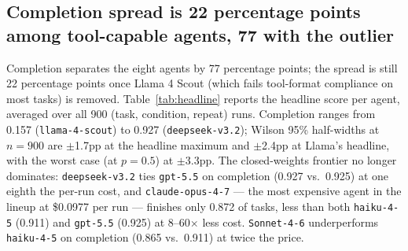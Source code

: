 \subsection{Completion spread is 22 percentage points among tool-capable agents, 77 with the outlier}
Completion separates the eight agents by 77 percentage points; the
spread is still 22 percentage points once Llama 4 Scout (which fails
tool-format compliance on most tasks) is removed.
Table~\ref{tab:headline} reports the headline score per agent,
averaged over all 900 (task, condition, repeat) runs. Completion
ranges from 0.157 (\texttt{llama-4-scout}) to 0.927
(\texttt{deepseek-v3.2}); Wilson 95\% half-widths at $n=900$ are
$\pm$1.7pp at the headline maximum and $\pm$2.4pp at Llama's
headline, with the worst case (at $p=0.5$) at $\pm$3.3pp. The
closed-weights frontier no longer dominates: \texttt{deepseek-v3.2}
ties \texttt{gpt-5.5} on completion (0.927 vs.\ 0.925) at one eighth
the per-run cost, and \texttt{claude-opus-4-7} — the most expensive
agent in the lineup at \$0.0977 per run — finishes only 0.872 of
tasks, less than both \texttt{haiku-4-5} (0.911) and \texttt{gpt-5.5}
(0.925) at 8--60$\times$ less cost. \texttt{Sonnet-4-6} underperforms
\texttt{haiku-4-5} on completion (0.865 vs.\ 0.911) at twice the
price.

